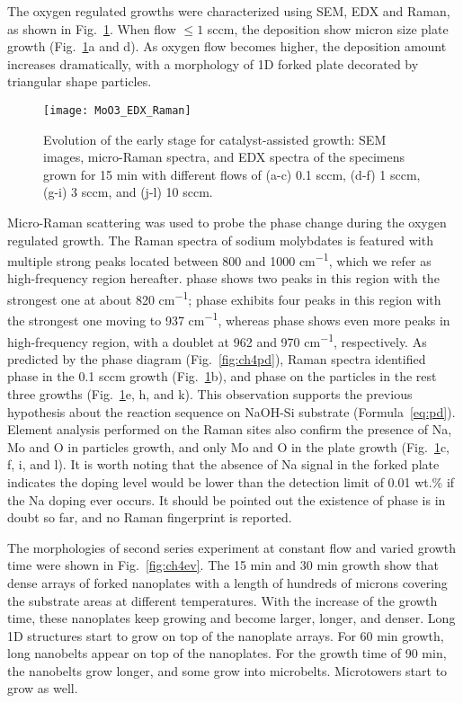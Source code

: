 The oxygen regulated growths were characterized using SEM, EDX and Raman, as shown in Fig.~\ref{fig:ch4oxy}. When  flow $\leq 1$ sccm, the deposition show micron size plate growth (Fig.~\ref{fig:ch4oxy}a and d). As oxygen flow becomes higher, the deposition amount increases dramatically, with a morphology of 1D forked plate decorated by triangular shape particles.
\begin{figure}[htb]
\centering
\texttt{[image: MoO3\_EDX\_Raman]}
\caption[Evolution of the early stage for catalyst-assisted  growth]{Evolution of the early stage for catalyst-assisted  growth: SEM images, micro-Raman spectra, and EDX spectra of the specimens grown for 15 min with different  flows of (a-c) 0.1 sccm, (d-f) 1 sccm, (g-i) 3 sccm, and (j-l) 10 sccm. }
\label{fig:ch4oxy}
\end{figure}

Micro-Raman scattering was used to probe the phase change during the oxygen regulated growth. The Raman spectra of sodium molybdates is featured with multiple strong peaks located between 800 and 1000 \si{cm^{-1}}, which we refer as high-frequency region hereafter.  phase shows two peaks in this region with the strongest one at about 820 \si{cm^{-1}};  phase exhibits four peaks in this region with the strongest one moving to 937 \si{cm^{-1}}, whereas  phase shows even more peaks in high-frequency region, with a doublet at 962 and 970 \si{cm^{-1}}, respectively.\cite{Schofield2005,Saraiva2011} As predicted by the phase diagram (Fig.~\ref{fig:ch4pd}), Raman spectra identified  phase in the 0.1 sccm growth (Fig.~\ref{fig:ch4oxy}b), and  phase on the particles in the rest three growths (Fig.~\ref{fig:ch4oxy}e, h, and k). This observation supports the previous hypothesis about the reaction sequence on NaOH-Si substrate (Formula~\ref{eq:pd}). Element analysis performed on the Raman sites also confirm the presence of Na, Mo and O in particles growth, and only Mo and O in the plate growth (Fig.~\ref{fig:ch4oxy}c, f, i, and l). It is worth noting that the absence of Na signal in the forked  plate indicates the doping level would be lower than the detection limit of 0.01 wt.\% if the Na doping ever occurs. It should be pointed out the existence of  phase is in doubt so far, and no Raman fingerprint is reported.\cite{Fomichev1992}  

The morphologies of second series experiment at constant  flow and varied growth time were shown in Fig.~\ref{fig:ch4ev}. The 15 min and 30 min growth show that dense arrays of  forked nanoplates with a length of hundreds of microns covering the substrate areas at different temperatures. With the increase of the growth time, these nanoplates keep growing and become larger, longer, and denser. Long 1D  structures start to grow on top of the nanoplate arrays. For 60 min growth, long nanobelts appear on top of the nanoplates. For the growth time of 90 min, the nanobelts grow longer, and some grow into microbelts. Microtowers start to grow as well.

